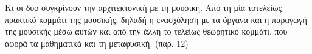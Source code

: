 Κι οι δύο συγκρίνουν την αρχιτεκτονική με τη μουσική. Από τη μία τοτελείως πρακτικό κομμάτι της μουσικής, δηλαδή η ενασχόληση με τα όργανα και η παραγωγή της μουσικής μέσω αυτών και από την άλλη το τελείως θεωρητικό κομμάτι, που αφορά τα μαθηματικά και τη μεταφυσική. (παρ. 12)








